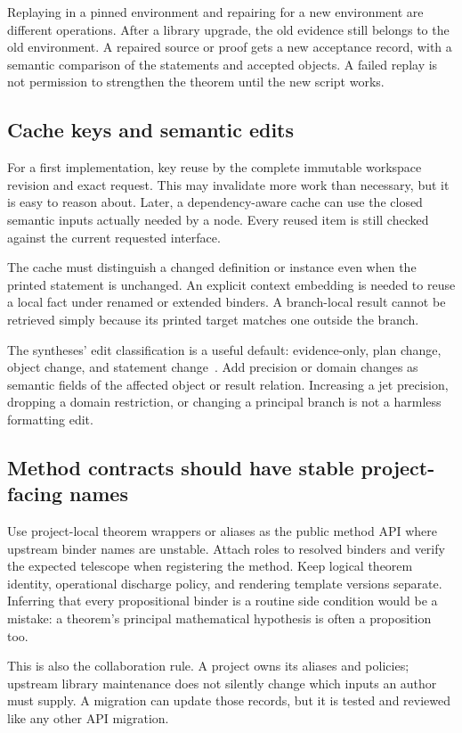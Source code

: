 \documentclass[11pt,letterpaper]{article}
\theoremstyle{definition}
\theoremstyle{remark}
\begin{document}
Replaying in a pinned environment and repairing for a new environment are
different operations. After a library upgrade, the old evidence still belongs
to the old environment. A repaired source or proof gets a new acceptance record,
with a semantic comparison of the statements and accepted objects. A failed
replay is not permission to strengthen the theorem until the new script works.

\subsection{Cache keys and semantic edits}
For a first implementation, key reuse by the complete immutable workspace
revision and exact request. This may invalidate more work than necessary,
but it is easy to reason about. Later, a dependency-aware cache can use the
closed semantic inputs actually needed by a node. Every reused item is still
checked against the current requested interface.

The cache must distinguish a changed definition or instance even when the
printed statement is unchanged. An explicit context embedding is needed to
reuse a local fact under renamed or extended binders. A branch-local result
cannot be retrieved simply because its printed target matches one outside
the branch.

The syntheses' edit classification is a useful default: evidence-only,
plan change, object change, and statement change~\cite{synthesis}. Add precision
or domain changes as semantic fields of the affected object or result relation.
Increasing a jet precision, dropping a domain restriction, or changing a
principal branch is not a harmless formatting edit.

\subsection{Method contracts should have stable project-facing names}
Use project-local theorem wrappers or aliases as the public method API where
upstream binder names are unstable. Attach roles to resolved binders and verify
the expected telescope when registering the method. Keep logical theorem
identity, operational discharge policy, and rendering template versions
separate. Inferring that every propositional binder is a routine side condition
would be a mistake: a theorem's principal mathematical hypothesis is often a
proposition too.

This is also the collaboration rule. A project owns its aliases and policies;
upstream library maintenance does not silently change which inputs an author
must supply. A migration can update those records, but it is tested and reviewed
like any other API migration.
\end{document}

